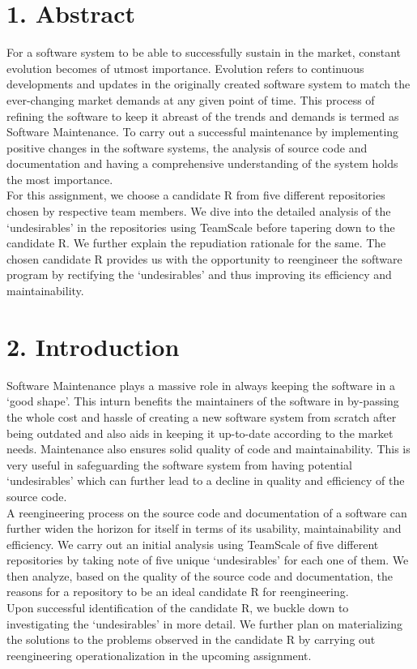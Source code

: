 \documentclass[letterpaper, 11pt]{report}
\begin{document}
\tableofcontents
\newpage
{}
\section*{1. Abstract}
\normalsize { For a software system to be able to successfully sustain in the market, constant evolution becomes of utmost importance. Evolution refers to continuous developments and updates in the originally created software system to match the ever-changing market demands at any given point of time. This process of refining the software to keep it abreast of the trends and demands is termed as Software Maintenance. To carry out a successful maintenance by implementing positive changes in the software systems, the analysis of source code and documentation and having a comprehensive understanding of the system holds the most importance.\\

For this assignment, we choose a candidate R from five different repositories chosen by respective team members. We dive into the detailed analysis of the ‘undesirables’ in the repositories using TeamScale before tapering down to the candidate R. We further explain the repudiation rationale for the same. The chosen candidate R provides us with the opportunity to reengineer the software program by rectifying the ‘undesirables’ and thus improving its efficiency and maintainability.
}

\section*{2. Introduction}
\normalsize {Software Maintenance plays a massive role in always keeping the software in a ‘good shape’. This inturn benefits the maintainers of the software in by-passing the whole cost and hassle of creating a new software system from scratch after being outdated and also aids in keeping it up-to-date according to the market needs. Maintenance also ensures solid quality of code and maintainability. This is very useful in safeguarding the software system from having potential ‘undesirables’ which can further lead to a decline in quality and efficiency of the source code.\\

A reengineering process on the source code and documentation of a software can further widen the horizon for itself in terms of its usability, maintainability and efficiency. We carry out an initial analysis using TeamScale of five different repositories by taking note of  five unique ‘undesirables’ for each one of them. We then analyze, based on the quality of the source code and documentation, the reasons for a repository to be an ideal candidate R for reengineering. \\

Upon successful identification of the candidate R, we buckle down to investigating the ‘undesirables’ in more detail. We further plan on materializing the solutions to the problems observed in the candidate R by carrying out reengineering operationalization in the upcoming assignment.}
\end{document}

